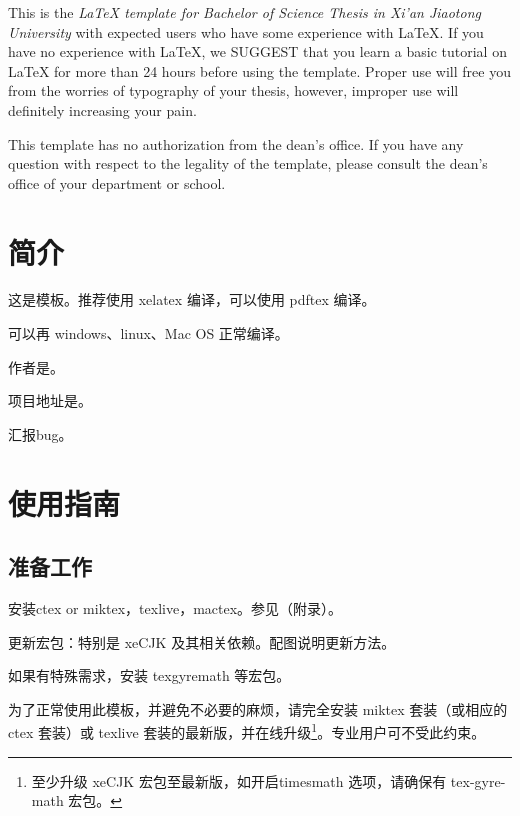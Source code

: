\documentclass[%
               print, 
              ]{xjtubsc}
\begin{document}

\begin{abstracten} %

This is the \emph{\LaTeX{} template for Bachelor of Science Thesis in Xi'an Jiaotong University} with expected users who have some experience with \LaTeX{}. If you have no experience with \LaTeX{}, we SUGGEST that you learn a basic tutorial on \LaTeX{} for more than 24 hours before using the template. Proper use will free you from the worries of typography of your thesis, however, improper use will definitely increasing your pain.

This template has no authorization from the dean's office. If you have any question with respect to the legality of the template, please consult the dean's office of your department or school.

\end{abstracten}


\tableofcontents %


\mainmatter


\section{简介}
这是模板。推荐使用 xelatex 编译，可以使用 pdftex 编译。

可以再 windows、linux、Mac OS 正常编译。

作者是。

项目地址是。

汇报bug。

\section{使用指南}
\subsection{准备工作}

安装ctex or miktex，texlive，mactex。参见（附录）。

更新宏包：特别是 xeCJK 及其相关依赖。配图说明更新方法。

如果有特殊需求，安装 texgyremath 等宏包。 

为了正常使用此模板，并避免不必要的麻烦，请完全安装 miktex 套装（或相应的 ctex 套装）或 texlive 套装的最新版，并在线升级\footnote{至少升级 xeCJK 宏包至最新版，如开启timesmath 选项，请确保有 tex-gyre-math 宏包。}。专业用户可不受此约束。
\end{document}

